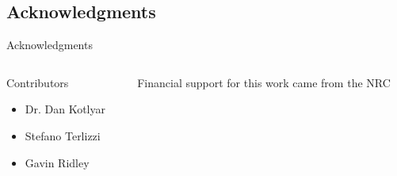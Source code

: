\subsection{Acknowledgments}
\begin{frame}{Acknowledgments}
    \begin{columns}[T]
        \begin{column}{\colShare}
            Contributors
            \begin{itemize}
                    \item Dr. Dan Kotlyar
                    \item Stefano Terlizzi
                    \item Gavin Ridley\footnotemark[1]
            \end{itemize}
        \end{column}
        \begin{column}{\colShare}
            Financial support for this work came from the NRC 
        \end{column}
    \end{columns}
\end{frame}


